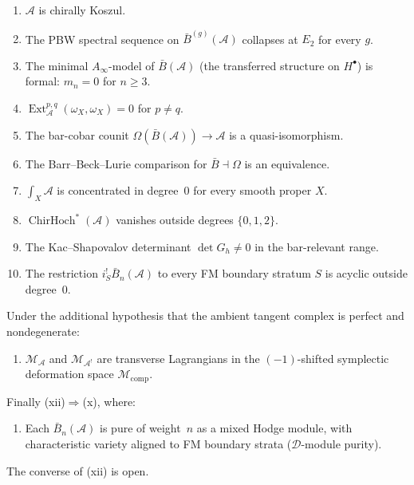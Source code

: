 \documentclass[11pt,reqno]{amsart}
\theoremstyle{definition}
\theoremstyle{remark}
\providecommand{\cA}{\mathcal{A}}
\providecommand{\barB}{\bar{B}}
\numberwithin{equation}{section}
\begin{document}
\begin{enumerate}[label=\textup{(\roman*)},nosep]
\item $\cA$ is chirally Koszul.
\item The PBW spectral sequence on $\barB^{(g)}(\cA)$ collapses at $E_2$ for every $g$.
\item The minimal $A_\infty$-model of $\barB(\cA)$ (the transferred structure on $H^\bullet$) is formal: $m_n=0$ for $n\ge 3$.
\item $\operatorname{Ext}^{p,q}_\cA(\omega_X,\omega_X)=0$ for $p\neq q$.
\item The bar-cobar counit $\Omega(\barB(\cA))\to\cA$ is a quasi-isomorphism.
\item The Barr--Beck--Lurie comparison for $\barB\dashv\Omega$ is an equivalence.
\item $\int_X\cA$ is concentrated in degree~$0$ for every smooth proper $X$.
\item $\operatorname{ChirHoch}^*(\cA)$ vanishes outside degrees $\{0,1,2\}$.
\item The Kac--Shapovalov determinant $\det G_h\neq 0$ in the bar-relevant range.
\item The restriction $i_S^!\barB_n(\cA)$ to every FM boundary stratum $S$ is acyclic outside degree~$0$.
\end{enumerate}

\noindent
Under the additional hypothesis that the ambient tangent complex is
perfect and nondegenerate:

\begin{enumerate}[label=\textup{(\roman*)},nosep,start=11]
\item $\mathcal M_\cA$ and $\mathcal M_{\cA^!}$ are transverse Lagrangians in the $(-1)$-shifted symplectic deformation space $\mathcal M_{\mathrm{comp}}$.
\end{enumerate}

\noindent
Finally (xii)$\Rightarrow$(x), where:

\begin{enumerate}[label=\textup{(\roman*)},nosep,start=12]
\item Each $\barB_n(\cA)$ is pure of weight~$n$ as a mixed Hodge module, with characteristic variety aligned to FM boundary strata ($\mathcal D$-module purity).
\end{enumerate}

\noindent The converse of (xii) is open.
\end{document}
